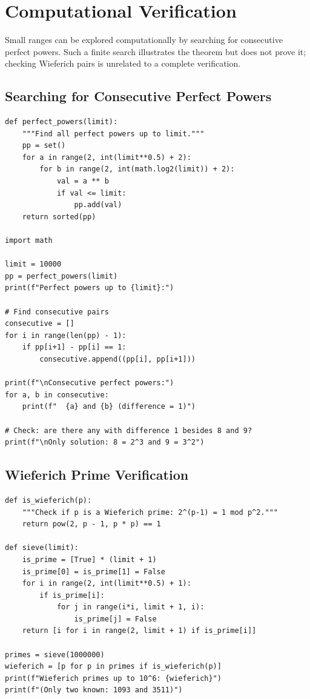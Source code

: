 \section{Computational Verification}

Small ranges can be explored computationally by searching for consecutive perfect powers. Such a finite search illustrates the theorem but does not prove it; checking Wieferich pairs is unrelated to a complete verification.

\subsection{Searching for Consecutive Perfect Powers}

\begin{verbatim}
def perfect_powers(limit):
    """Find all perfect powers up to limit."""
    pp = set()
    for a in range(2, int(limit**0.5) + 2):
        for b in range(2, int(math.log2(limit)) + 2):
            val = a ** b
            if val <= limit:
                pp.add(val)
    return sorted(pp)

import math

limit = 10000
pp = perfect_powers(limit)
print(f"Perfect powers up to {limit}:")

# Find consecutive pairs
consecutive = []
for i in range(len(pp) - 1):
    if pp[i+1] - pp[i] == 1:
        consecutive.append((pp[i], pp[i+1]))

print(f"\nConsecutive perfect powers:")
for a, b in consecutive:
    print(f"  {a} and {b} (difference = 1)")

# Check: are there any with difference 1 besides 8 and 9?
print(f"\nOnly solution: 8 = 2^3 and 9 = 3^2")
\end{verbatim}

\subsection{Wieferich Prime Verification}

\begin{verbatim}
def is_wieferich(p):
    """Check if p is a Wieferich prime: 2^(p-1) = 1 mod p^2."""
    return pow(2, p - 1, p * p) == 1

def sieve(limit):
    is_prime = [True] * (limit + 1)
    is_prime[0] = is_prime[1] = False
    for i in range(2, int(limit**0.5) + 1):
        if is_prime[i]:
            for j in range(i*i, limit + 1, i):
                is_prime[j] = False
    return [i for i in range(2, limit + 1) if is_prime[i]]

primes = sieve(1000000)
wieferich = [p for p in primes if is_wieferich(p)]
print(f"Wieferich primes up to 10^6: {wieferich}")
print(f"(Only two known: 1093 and 3511)")
\end{verbatim}

